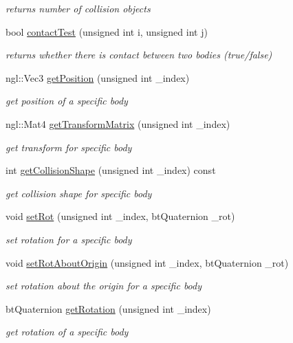 \begin{DoxyCompactItemize}
\begin{DoxyCompactList}\small\item\em returns number of collision objects \item\end{DoxyCompactList}\item 
bool \hyperlink{classPhysicsWorld_ae3820a8785542fd19563ad1d507bb4d9}{contactTest} (unsigned int i, unsigned int j)
\begin{DoxyCompactList}\small\item\em returns whether there is contact between two bodies (true/false) \item\end{DoxyCompactList}\item 
ngl::Vec3 \hyperlink{classPhysicsWorld_a528a5fc5907a9bf3e8ab2bfe1be5b05f}{getPosition} (unsigned int \_\-index)
\begin{DoxyCompactList}\small\item\em get position of a specific body \item\end{DoxyCompactList}\item 
ngl::Mat4 \hyperlink{classPhysicsWorld_acef2efa13c576073a2a907709114422d}{getTransformMatrix} (unsigned int \_\-index)
\begin{DoxyCompactList}\small\item\em get transform for specific body \item\end{DoxyCompactList}\item 
int \hyperlink{classPhysicsWorld_aafb952042dbd62fff1de9447557c5b58}{getCollisionShape} (unsigned int \_\-index) const 
\begin{DoxyCompactList}\small\item\em get collision shape for specific body \item\end{DoxyCompactList}\item 
void \hyperlink{classPhysicsWorld_abfbb11f5d5222deea4306838b2fb7c5e}{setRot} (unsigned int \_\-index, btQuaternion \_\-rot)
\begin{DoxyCompactList}\small\item\em set rotation for a specific body \item\end{DoxyCompactList}\item 
void \hyperlink{classPhysicsWorld_aba35e36f54d2898d83b9fb57a1d00462}{setRotAboutOrigin} (unsigned int \_\-index, btQuaternion \_\-rot)
\begin{DoxyCompactList}\small\item\em set rotation about the origin for a specific body \item\end{DoxyCompactList}\item 
btQuaternion \hyperlink{classPhysicsWorld_a9e9d15147f52d67384d197bdbfddbedf}{getRotation} (unsigned int \_\-index)
\begin{DoxyCompactList}\small\item\em get rotation of a specific body \item\end{DoxyCompactList}\end{DoxyCompactItemize}

